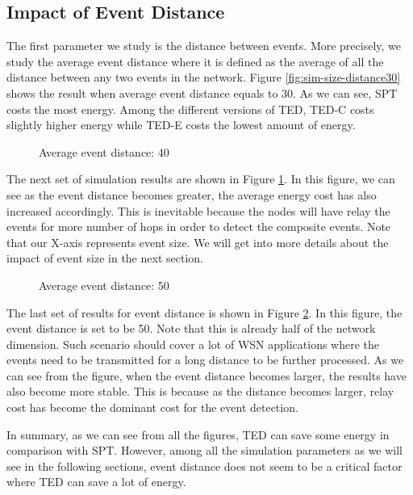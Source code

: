 \subsection{Impact of Event Distance}
The first parameter we study is the distance between events. More precisely, we study the average event distance where it is defined as the average of all the distance between any two events in the network. Figure \ref{fig:sim-size-distance30} shows the result when average event distance equals to 30. As we can see, SPT costs the most energy. Among the different versions of TED, TED-C costs slightly higher energy while TED-E costs the lowest amount of energy.

\begin{figure}
\centering
{}
\caption{Average event distance: 40}
\label{fig:sim-size-distance40}
\end{figure}

The next set of simulation results are shown in Figure \ref{fig:sim-size-distance40}. In this figure, we can see as the event distance becomes greater, the average energy cost has also increased accordingly. This is inevitable because the nodes will have relay the events for more number of hops in order to detect the composite events. Note that our X-axis represents event size. We will get into more details about the impact of event size in the next section.

\begin{figure}
\centering
{}
\caption{Average event distance: 50}
\label{fig:sim-size-distance50}
\end{figure}

The last set of results for event distance is shown in Figure \ref{fig:sim-size-distance50}. In this figure, the event distance is set to be 50. Note that this is already half of the network dimension. Such scenario should cover a lot of WSN applications where the events need to be transmitted for a long distance to be further processed. As we can see from the figure, when the event distance becomes larger, the results have also become more stable. This is because as the distance becomes larger, relay cost has become the dominant cost for the event detection.

In summary, as we can see from all the figures, TED can save some energy in comparison with SPT. However, among all the simulation parameters as we will see in the following sections, event distance does not seem to be a critical factor where TED can save a lot of energy.

